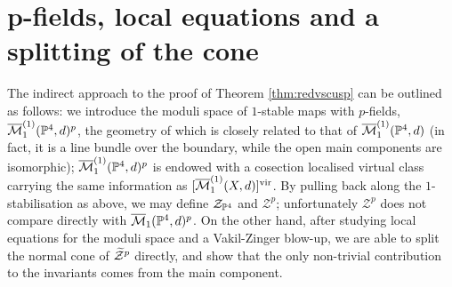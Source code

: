 \section{p-fields, local equations and a splitting of the cone}

The indirect approach to the proof of Theorem \ref{thm:redvscusp} can be outlined as follows: we introduce the moduli space of $1$-stable maps with $p$-fields, $\overline{\mathcal{M}}_1^{(1)}(\mathbb P^4,d)^p$, the geometry of which is closely related to that of $\overline{\mathcal{M}}_1^{(1)}(\mathbb P^4,d)$ (in fact, it is a line bundle over the boundary, while the open main components are isomorphic); $\overline{\mathcal{M}}_1^{(1)}(\mathbb P^4,d)^p$ is endowed with a cosection localised virtual class carrying the same information as $[\overline{\mathcal{M}}_1^{(1)}(X,d)]^{\mathrm{vir}}$. By pulling back along the $1$-stabilisation as above, we may define $\mathcal Z_{\mathbb P^4}$ and $\mathcal Z^p$; unfortunately $\mathcal Z^p$ does not compare directly with $\overline{\mathcal{M}}_1(\mathbb P^4,d)^p$. On the other hand, after studying local equations for the moduli space and a Vakil-Zinger blow-up, we are able to split the normal cone of $\widetilde{\mathcal Z}^p$ directly, and show that the only non-trivial contribution to the invariants comes from the main component.

